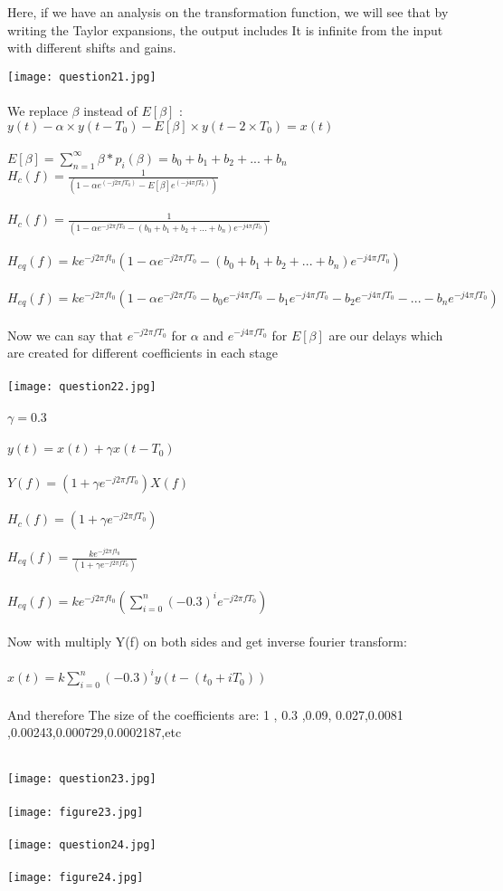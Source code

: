 \documentclass{article}
\begin{document}
\begin{latin}
Here, if we have an analysis on the transformation function, we will see that by writing the Taylor expansions, the output includes
It is infinite from the input with different shifts and gains.

\texttt{[image: question21.jpg]}\\\\

We replace  $\beta$ instead of $E[\beta]$ :
$y(t) - \alpha\times y(t - T_0) - {E[\beta]}\times y(t - 2\times T_0) = x(t)$\\\\
${E[\beta]} =  \sum_{n=1}^{\infty}  \beta* p_i(\beta)  = b_0 + b_1 + b_2 + ... + b_n$
$H_c(f) = \frac{1}{ (1 - \alpha e^(-j2\pi fT_0)-{E[\beta]} e^(-j4\pi f T_0))}$ \\\\
$H_c(f) = \frac{1}{ (1 - \alpha e^{-j2\pi fT_0}-(b_0 + b_1 + b_2 + ... + b_n) e^{-j4\pi f T_0})}$ \\\\
$H_{eq}(f) = ke^{-j2\pi ft_0}  (1 - \alpha e^{-j2\pi fT_0}-(b_0 + b_1 + b_2 + ... + b_n) e^{-j4\pi f T_0})$\\\\
$H_{eq}(f) = ke^{-j2\pi ft_0}  (1 - \alpha e^{-j2\pi fT_0}-b_0 e^{-j4\pi f T_0} - b_1e^{-j4\pi f T_0} - b_2 e^{-j4\pi f T_0} - ... - b_n e^{-j4\pi f T_0})$\\\\
Now we can say that   $e^{-j2\pi f T_0}$ for $\alpha$ and $e^{-j4\pi f T_0}$ for ${E[\beta]}$ are our delays which are created for different coefficients in each stage\\\\
\texttt{[image: question22.jpg]}\\\\
$\gamma = 0.3$\\\\
$y(t) =  x(t) + \gamma x(t - T_0)$\\\\
$Y(f) = (1 + \gamma e^{-j2\pi fT_0})X(f)$\\\\ 
$H_c(f) = (1 + \gamma e^{-j2\pi fT_0})$\\\\
$H_{eq}(f) = \frac{ke^{-j2\pi ft_0}} {(1 + \gamma e^{-j2\pi fT_0})}$\\\\
$H_{eq}(f)=ke^{-j2 \pi ft_0}(\sum_{i=0}^{n} (−0.3)^i e^{ −j2\pi fT_0})$\\\\
Now with multiply Y(f) on both sides and get inverse fourier transform:\\\\
$x(t)=k\sum_{i=0}^{n} (-0.3)^iy(t - ( t_0+ iT_0))$\\\\
And therefore The size of the coefficients are:
1 , 0.3 ,0.09, 0.027,0.0081 ,0.00243,0.000729,0.0002187,etc\\\\
\end{latin}
\texttt{[image: question23.jpg]}\\\\
\texttt{[image: figure23.jpg]}\\\\
\texttt{[image: question24.jpg]}\\\\
\texttt{[image: figure24.jpg]}\\\\
\end{document}
